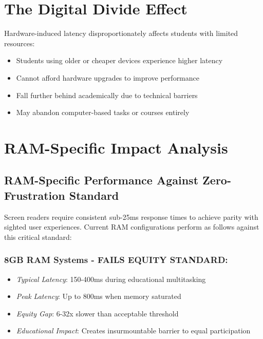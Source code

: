 \section{The Digital Divide Effect}\label{the-digital-divide-effect}

Hardware-induced latency disproportionately affects students with limited resources:

\begin{itemize}
\item Students using older or cheaper devices experience higher latency
\item Cannot afford hardware upgrades to improve performance
\item Fall further behind academically due to technical barriers
\item May abandon computer-based tasks or courses entirely
\end{itemize}

\section{RAM-Specific Impact Analysis}\label{ram-specific-impact-analysis}

\subsection{RAM-Specific Performance Against Zero-Frustration Standard}\label{ram-specific-performance-against-zero-frustration-standard}

Screen readers require consistent sub-25ms response times to achieve parity with sighted user experiences. Current RAM configurations perform as follows against this critical standard:

\subsubsection{8GB RAM Systems - FAILS EQUITY STANDARD:}

\begin{itemize}
\item \emph{Typical Latency}: 150-400ms during educational multitasking
\item \emph{Peak Latency}: Up to 800ms when memory saturated
\item \emph{Equity Gap}: 6-32x slower than acceptable threshold
\item \emph{Educational Impact}: Creates insurmountable barrier to equal participation
\end{itemize}

